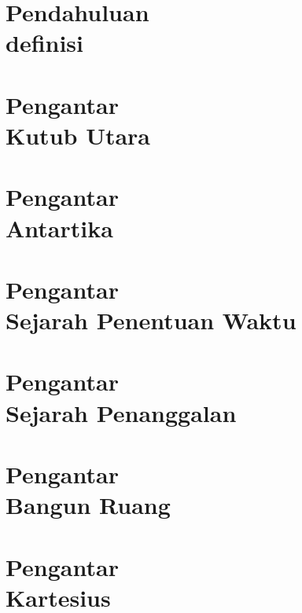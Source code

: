 \documentclass{WileySix}
\begin{document}
%



\chapter[Pendahuluan]
{Pendahuluan\\ definisi}


\chapter[Sejarah Kutub Utara]
{Pengantar\\ Kutub Utara}


\chapter[Tentang Kutub Selatan]
{Pengantar\\ Antartika}


\chapter[Sejarah Penentuan Waktu]
{Pengantar\\ Sejarah Penentuan Waktu}


\chapter[Sejarah Penanggalan]
{Pengantar\\ Sejarah  Penanggalan}




\chapter[Bangun Ruang]
{Pengantar\\ Bangun Ruang}


\chapter[Diagram Kartesius]
{Pengantar\\ Kartesius}

\end{document}

